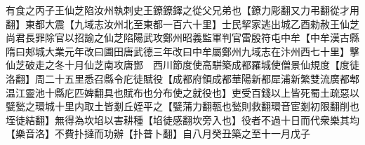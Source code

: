 有食之丙子王仙芝陷汝州執刺史王鐐鐐鐸之從父兄弟也【鐐力彫翻又力弔翻從才用翻】東都大震【九域志汝州北至東都一百六十里】士民挈家逃出城乙酉勑赦王仙芝尚君長罪除官以招諭之仙芝陷陽武攻鄭州昭義監軍判官雷殷符屯中牟【中牟漢古縣隋曰郟城大業元年改曰圃田唐武德三年改曰中牟屬鄭州九域志在汴州西七十里】擊仙芝破走之冬十月仙芝南攻唐鄧　西川節度使高駢築成都羅城使僧景仙規度【度徒洛翻】周二十五里悉召縣令庀徒賦役【成都府領成都華陽新都犀浦新繁雙流廣都郫温江靈池十縣庀匹婢翻具也賦布也分布使之就役也】吏受百錢以上皆死蜀土疏惡以甓甃之環城十里内取土皆剗丘姪平之【甓蒲力翻甎也甃則救翻環音宦剗初限翻削也垤徒結翻】無得為坎埳以害耕種【埳徒感翻坎旁入也】役者不過十日而代衆樂其均【樂音洛】不費扑撻而功辦【扑普卜翻】自八月癸丑築之至十一月戊子